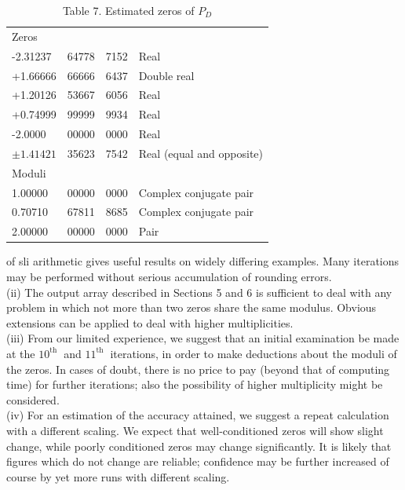 \documentclass[10pt]{article}
\begin{document}
\begin{table}[h]
\begin{center}
\captionsetup{labelformat=empty}
\caption{Table 7. Estimated zeros of $P_{D}$}
\begin{tabular}{llll}
\multicolumn{4}{l}{Zeros} \\
-2.31237 & 64778 & 7152 & Real \\
+1.66666 & 66666 & 6437 & Double real \\
+1.20126 & 53667 & 6056 & Real \\
+0.74999 & 99999 & 9934 & Real \\
-2.0000 & 00000 & 0000 & Real \\
$\pm 1.41421$ & 35623 & 7542 & Real (equal and opposite) \\
Moduli &  &  &  \\
1.00000 & 00000 & 0000 & Complex conjugate pair \\
0.70710 & 67811 & 8685 & Complex conjugate pair \\
2.00000 & 00000 & 0000 & Pair \\
\end{tabular}
\end{center}
\end{table}

of sli arithmetic gives useful results on widely differing examples. Many iterations may be performed without serious accumulation of rounding errors.\\
(ii) The output array described in Sections 5 and 6 is sufficient to deal with any problem in which not more than two zeros share the same modulus. Obvious extensions can be applied to deal with higher multiplicities.\\
(iii) From our limited experience, we suggest that an initial examination be made at the $10^{\text {th }}$ and $11^{\text {th }}$ iterations, in order to make deductions about the moduli of the zeros. In cases of doubt, there is no price to pay (beyond that of computing time) for further iterations; also the possibility of higher multiplicity might be considered.\\
(iv) For an estimation of the accuracy attained, we suggest a repeat calculation with a different scaling. We expect that well-conditioned zeros will show slight change, while poorly conditioned zeros may change significantly. It is likely that figures which do not change are reliable; confidence may be further increased of course by yet more runs with different scaling.
\end{document}
